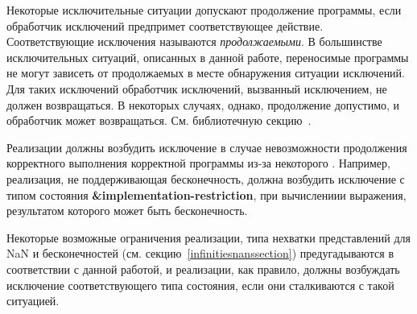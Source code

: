Некоторые исключительные ситуации допускают продолжение программы, если обработчик исключений
предпримет соответствующее действие. Соответствующие исключения называются
\textit{продолжаемыми}. В большинстве исключительных ситуаций,
описанных в данной работе, переносимые программы не могут зависеть от продолжаемых в месте
обнаружения ситуации исключений. Для таких исключений обработчик исключений, вызванный
исключением, не должен возвращаться. В некоторых случаях, однако, продолжение допустимо, и
обработчик может возвращаться. См. библиотечную
секцию~.

Реализации должны возбудить исключение в случае невозможности продолжения корректного выполнения
корректной программы из-за некоторого . Например, реализация,
не поддерживающая бесконечность, должна возбудить исключение с типом состояния
{\cf\bfseries\&implementation-restriction}, при вычислениии выражения, результатом которого
может быть бесконечность.

Некоторые возможные ограничения реализации, типа нехватки представлений для NaN и
бесконечностей (см. секцию~\ref{infinitiesnanssection}) предугадываются в соответствии с данной
работой, и реализации, как правило, должны возбуждать исключение соответствующего типа
состояния, если они сталкиваются с такой ситуацией.

